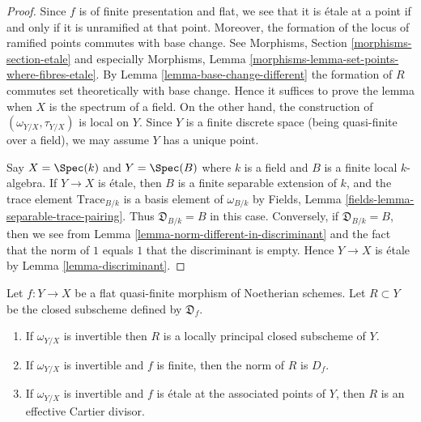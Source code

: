 \begin{proof}
Since $f$ is of finite presentation and flat, we see that it is \'etale
at a point if and only if it is unramified at that point. Moreover, the
formation of the locus of ramified points commutes with base change.
See Morphisms, Section \ref{morphisms-section-etale} and especially
Morphisms, Lemma \ref{morphisms-lemma-set-points-where-fibres-etale}.
By Lemma \ref{lemma-base-change-different} the formation of $R$ commutes
set theoretically with base change. Hence it suffices to prove the
lemma when $X$ is the spectrum of a field. On the other hand, the
construction of $(\omega_{Y/X}, \tau_{Y/X})$ is local on $Y$.
Since $Y$ is a finite discrete space (being quasi-finite
over a field), we may assume $Y$ has a unique point.

\medskip\noindent
Say $X = \Spec(k)$ and $Y = \Spec(B)$ where $k$ is a field and $B$ is
a finite local $k$-algebra. If $Y \to X$ is \'etale, then
$B$ is a finite separable extension of $k$, and the trace
element $\text{Trace}_{B/k}$ is a basis element of $\omega_{B/k}$
by Fields, Lemma \ref{fields-lemma-separable-trace-pairing}.
Thus $\mathfrak{D}_{B/k} = B$ in this case.
Conversely, if $\mathfrak{D}_{B/k} = B$, then we see from
Lemma \ref{lemma-norm-different-in-discriminant}
and the fact that the norm of $1$ equals $1$ that the
discriminant is empty. Hence
$Y \to X$ is \'etale by Lemma \ref{lemma-discriminant}.
\end{proof}

\begin{lemma}
\label{lemma-norm-different-is-discriminant}
Let $f : Y \to X$ be a flat quasi-finite morphism of Noetherian schemes.
Let $R \subset Y$ be the closed subscheme defined by $\mathfrak{D}_f$.
\begin{enumerate}
\item If $\omega_{Y/X}$ is invertible
then $R$ is a locally principal closed subscheme of $Y$.
\item If $\omega_{Y/X}$ is invertible and $f$ is finite, then
the norm of $R$ is $D_f$.
\item If $\omega_{Y/X}$ is invertible and $f$
is \'etale at the associated points of $Y$, then $R$
is an effective Cartier divisor.
\end{enumerate}
\end{lemma}

